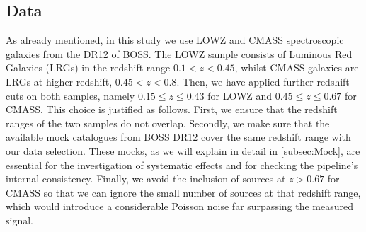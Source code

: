 \documentclass[astrosymb,twocolumn]{aastex631}
\newcommand{\stefc}[1]{\textcolor{red}{\textsf{[\textbf{Stef:} #1]}}}
\begin{document}
\subsection{Data}
\label{sec:data}
As already mentioned, in this study we use LOWZ and CMASS spectroscopic galaxies from the DR12 of BOSS. The LOWZ sample consists of Luminous Red Galaxies (LRGs) in the redshift range \(0.1<z<0.45\), whilst CMASS galaxies are LRGs at higher redshift, \(0.45<z<0.8\). Then, we have applied further redshift cuts on both samples, namely \(0.15\leq z \le 0.43\) for LOWZ and \(0.45\leq z \leq 0.67\) for CMASS. This choice is justified as follows. First, we ensure that the redshift ranges of the two samples do not overlap. Secondly, we make sure that the available mock catalogues from BOSS DR12 cover the same redshift range with our data selection. These mocks, as we will explain in detail in \autoref{subsec:Mock}, are essential for the investigation of systematic effects and for checking the pipeline's internal consistency. Finally, we avoid the inclusion of sources at \(z>0.67\) for CMASS so that we can ignore the small number of sources at that redshift range, which would introduce a considerable Poisson noise far surpassing the measured signal. 

\end{document}
